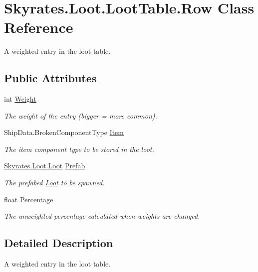 \hypertarget{class_skyrates_1_1_loot_1_1_loot_table_1_1_row}{\section{Skyrates.\-Loot.\-Loot\-Table.\-Row Class Reference}
\label{class_skyrates_1_1_loot_1_1_loot_table_1_1_row}
}


A weighted entry in the loot table.  


\subsection*{Public Attributes}
\begin{DoxyCompactItemize}
\item 
int \hyperlink{class_skyrates_1_1_loot_1_1_loot_table_1_1_row_add613954731de35f73e733bd7297108e}{Weight}
\begin{DoxyCompactList}\small\item\em The weight of the entry (bigger = more common). \end{DoxyCompactList}\item 
Ship\-Data.\-Broken\-Component\-Type \hyperlink{class_skyrates_1_1_loot_1_1_loot_table_1_1_row_a4bf5c8a94125e9b55c7a8d54d423e80d}{Item}
\begin{DoxyCompactList}\small\item\em The item component type to be stored in the loot. \end{DoxyCompactList}\item 
\hyperlink{class_skyrates_1_1_loot_1_1_loot}{Skyrates.\-Loot.\-Loot} \hyperlink{class_skyrates_1_1_loot_1_1_loot_table_1_1_row_a4da28d84576418b42f86ef1f9dafaa1b}{Prefab}
\begin{DoxyCompactList}\small\item\em The prefabed \hyperlink{class_skyrates_1_1_loot_1_1_loot}{Loot} to be spawned. \end{DoxyCompactList}\item 
float \hyperlink{class_skyrates_1_1_loot_1_1_loot_table_1_1_row_afc1a4debcfbfb5257ee4760bd87581d9}{Percentage}
\begin{DoxyCompactList}\small\item\em The unweighted percentage calculated when weights are changed. \end{DoxyCompactList}\end{DoxyCompactItemize}


\subsection{Detailed Description}
A weighted entry in the loot table. 



